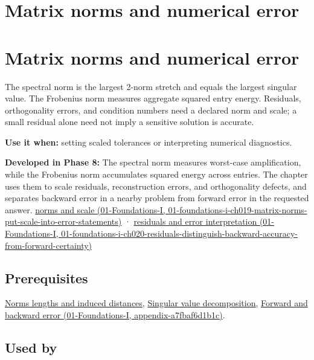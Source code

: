 \hypertarget{appendix-f8657bac66e5}{}
\section*{Matrix norms and numerical error}
\section{Matrix norms and numerical error}\label{appendix-f8657bac66e5-matrix-norms-and-numerical-error}

The spectral norm is the largest 2-norm stretch and equals the largest singular value. The Frobenius norm measures aggregate squared entry energy. Residuals, orthogonality errors, and condition numbers need a declared norm and scale; a small residual alone need not imply a sensitive solution is accurate.

\textbf{Use it when:} setting scaled tolerances or interpreting numerical diagnostics.

\textbf{Developed in Phase 8:} The spectral norm measures worst-case amplification, while the Frobenius norm accumulates squared energy across entries. The chapter uses them to scale residuals, reconstruction errors, and orthogonality defects, and separates backward error in a nearby problem from forward error in the requested answer. \href{../01-Foundations-I/main.pdf\#nameddest=01-foundations-i-ch019-matrix-norms-put-scale-into-error-statements}{norms and scale (01-Foundations-I, 01-foundations-i-ch019-matrix-norms-put-scale-into-error-statements)} · \href{../01-Foundations-I/main.pdf\#nameddest=01-foundations-i-ch020-residuals-distinguish-backward-accuracy-from-forward-certainty}{residuals and error interpretation (01-Foundations-I, 01-foundations-i-ch020-residuals-distinguish-backward-accuracy-from-forward-certainty)}

\subsection{Prerequisites}\label{appendix-f8657bac66e5-prerequisites}

\hyperref[appendix-49933872bb51]{Norms lengths and induced distances}, \hyperref[appendix-1fad5e7f36fa]{Singular value decomposition}, \href{../01-Foundations-I/main.pdf\#nameddest=appendix-a7fbaf6d1b1c}{Forward and backward error (01-Foundations-I, appendix-a7fbaf6d1b1c)}.

\subsection{Used by}\label{appendix-f8657bac66e5-used-by}

